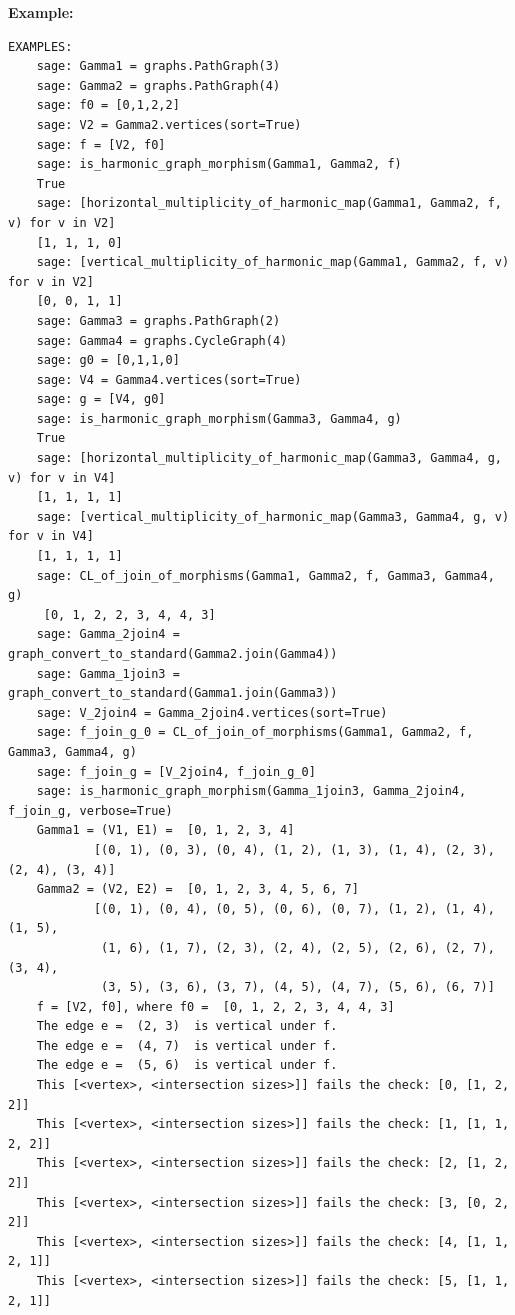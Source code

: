 \documentclass{article}
\begin{document}
\noindent
\textbf{Example:}
{\small{
\begin{verbatim}
EXAMPLES:
    sage: Gamma1 = graphs.PathGraph(3)    
    sage: Gamma2 = graphs.PathGraph(4)     
    sage: f0 = [0,1,2,2]     
    sage: V2 = Gamma2.vertices(sort=True)  
    sage: f = [V2, f0]         
    sage: is_harmonic_graph_morphism(Gamma1, Gamma2, f)    
    True
    sage: [horizontal_multiplicity_of_harmonic_map(Gamma1, Gamma2, f, v) for v in V2] 
    [1, 1, 1, 0]
    sage: [vertical_multiplicity_of_harmonic_map(Gamma1, Gamma2, f, v) for v in V2]  
    [0, 0, 1, 1]
    sage: Gamma3 = graphs.PathGraph(2)   
    sage: Gamma4 = graphs.CycleGraph(4) 
    sage: g0 = [0,1,1,0]   
    sage: V4 = Gamma4.vertices(sort=True) 
    sage: g = [V4, g0]   
    sage: is_harmonic_graph_morphism(Gamma3, Gamma4, g)  
    True
    sage: [horizontal_multiplicity_of_harmonic_map(Gamma3, Gamma4, g, v) for v in V4]  
    [1, 1, 1, 1]
    sage: [vertical_multiplicity_of_harmonic_map(Gamma3, Gamma4, g, v) for v in V4]  
    [1, 1, 1, 1]
    sage: CL_of_join_of_morphisms(Gamma1, Gamma2, f, Gamma3, Gamma4, g)  
     [0, 1, 2, 2, 3, 4, 4, 3]
    sage: Gamma_2join4 = graph_convert_to_standard(Gamma2.join(Gamma4))    
    sage: Gamma_1join3 = graph_convert_to_standard(Gamma1.join(Gamma3))   
    sage: V_2join4 = Gamma_2join4.vertices(sort=True)    
    sage: f_join_g_0 = CL_of_join_of_morphisms(Gamma1, Gamma2, f, Gamma3, Gamma4, g) 
    sage: f_join_g = [V_2join4, f_join_g_0]    
    sage: is_harmonic_graph_morphism(Gamma_1join3, Gamma_2join4, f_join_g, verbose=True)   
    Gamma1 = (V1, E1) =  [0, 1, 2, 3, 4] 
            [(0, 1), (0, 3), (0, 4), (1, 2), (1, 3), (1, 4), (2, 3), (2, 4), (3, 4)]
    Gamma2 = (V2, E2) =  [0, 1, 2, 3, 4, 5, 6, 7] 
            [(0, 1), (0, 4), (0, 5), (0, 6), (0, 7), (1, 2), (1, 4), (1, 5), 
             (1, 6), (1, 7), (2, 3), (2, 4), (2, 5), (2, 6), (2, 7), (3, 4), 
             (3, 5), (3, 6), (3, 7), (4, 5), (4, 7), (5, 6), (6, 7)]
    f = [V2, f0], where f0 =  [0, 1, 2, 2, 3, 4, 4, 3]
    The edge e =  (2, 3)  is vertical under f.
    The edge e =  (4, 7)  is vertical under f.
    The edge e =  (5, 6)  is vertical under f.
    This [<vertex>, <intersection sizes>]] fails the check: [0, [1, 2, 2]]
    This [<vertex>, <intersection sizes>]] fails the check: [1, [1, 1, 2, 2]]
    This [<vertex>, <intersection sizes>]] fails the check: [2, [1, 2, 2]]
    This [<vertex>, <intersection sizes>]] fails the check: [3, [0, 2, 2]]
    This [<vertex>, <intersection sizes>]] fails the check: [4, [1, 1, 2, 1]]
    This [<vertex>, <intersection sizes>]] fails the check: [5, [1, 1, 2, 1]]

\end{verbatim}}}
\end{document}
